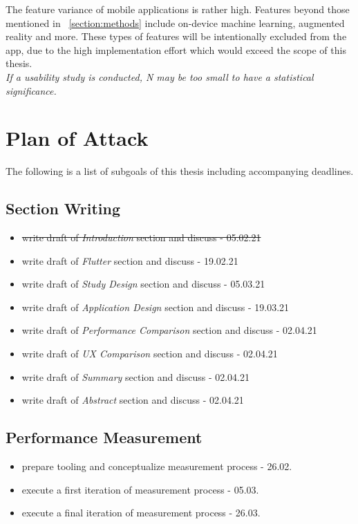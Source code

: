 The feature variance of mobile applications is rather high. 
Features beyond those mentioned in ~\ref{section:methods} include on-device machine learning, augmented reality and more. 
These types of features will be intentionally excluded from the app, 
due to the high implementation effort which would exceed the scope of this thesis.\\
\textit{If a usability study is conducted, N may be too small to have a statistical significance.}

\section{Plan of Attack}
\label{section:planofattack}
The following is a list of subgoals of this thesis including accompanying deadlines.

\subsection{Section Writing}
\begin{itemize}
    \item \sout{write draft of \textit{Introduction} section and discuss - 05.02.21}
    \item write draft of \textit{Flutter} section and discuss - 19.02.21
    \item write draft of \textit{Study Design} section and discuss - 05.03.21
    \item write draft of \textit{Application Design} section and discuss - 19.03.21
    \item write draft of \textit{Performance Comparison} section and discuss - 02.04.21
    \item write draft of \textit{UX Comparison} section and discuss - 02.04.21
    \item write draft of \textit{Summary} section and discuss - 02.04.21
    \item write draft of \textit{Abstract} section and discuss - 02.04.21
\end{itemize}


\subsection{Performance Measurement}
\begin{itemize}
    \item prepare tooling and conceptualize measurement process - 26.02.
    \item execute a first iteration of measurement process - 05.03.
    \item execute a final iteration of measurement process - 26.03.
\end{itemize}

